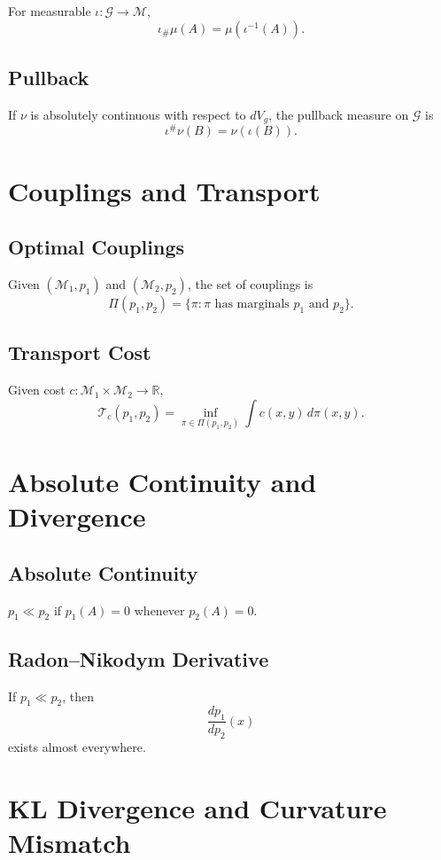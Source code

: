 For measurable $\iota:\mathcal{G}\to\mathcal{M}$,
\[
\iota_\# \mu(A) = \mu(\iota^{-1}(A)).
\]

\subsection{Pullback}

If $\nu$ is absolutely continuous with respect to $dV_g$, the pullback measure on $\mathcal{G}$ is
\[
\iota^\# \nu(B) = \nu(\iota(B)).
\]

\section{Couplings and Transport}

\subsection{Optimal Couplings}

Given $(\mathcal{M}_1,p_1)$ and $(\mathcal{M}_2,p_2)$, the set of couplings is
\[
\Pi(p_1,p_2)
  = \bigl\{ \pi : \text{$\pi$ has marginals $p_1$ and $p_2$} \bigr\}.
\]

\subsection{Transport Cost}

Given cost $c:\mathcal{M}_1\times\mathcal{M}_2\to\mathbb{R}$,
\[
\mathcal{T}_c(p_1,p_2)
  = \inf_{\pi\in\Pi(p_1,p_2)} \int c(x,y)\, d\pi(x,y).
\]

\section{Absolute Continuity and Divergence}

\subsection{Absolute Continuity}

$p_1 \ll p_2$ if $p_1(A)=0$ whenever $p_2(A)=0$.

\subsection{Radon–Nikodym Derivative}

If $p_1\ll p_2$, then
\[
\frac{dp_1}{dp_2}(x)
\]
exists almost everywhere.

\section{KL Divergence and Curvature Mismatch}

